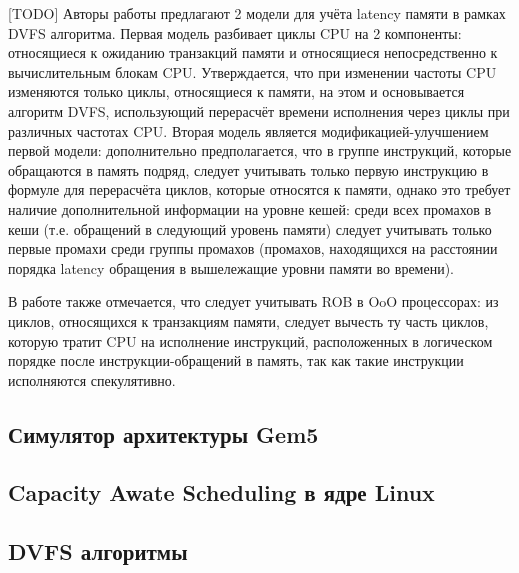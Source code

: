     [TODO] Авторы работы \cite{keramidas2010interval} предлагают 2 модели для учёта latency памяти
    в рамках DVFS алгоритма. Первая модель разбивает циклы CPU на 2 компоненты: относящиеся
    к ожиданию транзакций памяти и относящиеся непосредственно к вычислительным блокам CPU.
    Утверждается, что при изменении частоты CPU изменяются только циклы, относящиеся к памяти,
    на этом и основывается алгоритм DVFS, использующий перерасчёт времени исполнения через
    циклы при различных частотах CPU. Вторая модель является модификацией-улучшением первой модели:
    дополнительно предполагается, что в группе инструкций, которые обращаются в память подряд,
    следует учитывать только первую инструкцию в формуле для перерасчёта циклов, которые относятся
    к памяти, однако это требует наличие дополнительной информации на уровне кешей: среди всех
    промахов в кеши (т.е. обращений в следующий уровень памяти) следует учитывать только первые
    промахи среди группы промахов (промахов, находящихся на расстоянии порядка latency обращения
    в вышележащие уровни памяти во времени).

    В работе также отмечается, что следует учитывать ROB в OoO процессорах: из циклов, относящихся к
    транзакциям памяти, следует вычесть ту часть циклов, которую тратит CPU на исполнение
    инструкций, расположенных в логическом порядке после инструкции-обращений в память,
    так как такие инструкции исполняются спекулятивно.



\subsection{Симулятор архитектуры Gem5}

\subsection{Capacity Awate Scheduling в ядре Linux}

\subsection{DVFS алгоритмы}



\newpage
